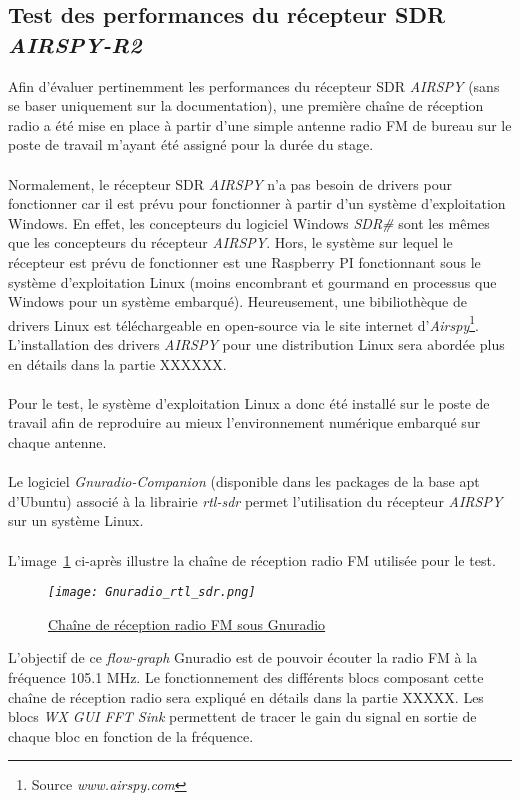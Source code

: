 \documentclass[12pt,fleqn]{book} %
\begin{document}
\subsection{Test des performances du récepteur SDR \emph{AIRSPY-R2}}
Afin d'évaluer pertinemment les performances du récepteur SDR \emph{AIRSPY} (sans se baser uniquement sur la documentation), une première chaîne de réception radio a été mise en place à partir d'une simple antenne radio FM de bureau sur le poste de travail m'ayant été assigné pour la durée du stage.
~\\\\Normalement, le récepteur SDR \emph{AIRSPY} n'a pas besoin de drivers pour fonctionner car il est prévu pour fonctionner à partir d'un système d'exploitation Windows. En effet, les concepteurs du logiciel Windows \emph{SDR\#} sont les mêmes que les concepteurs du récepteur \emph{AIRSPY}. Hors, le système sur lequel le récepteur est prévu de fonctionner est une Raspberry PI fonctionnant sous le système d'exploitation Linux (moins encombrant et gourmand en processus que Windows pour un système embarqué). Heureusement, une bibiliothèque de drivers Linux est téléchargeable en open-source via le site internet d'\emph{Airspy}\footnote{Source \emph{www.airspy.com}}. L'installation des drivers \emph{AIRSPY} pour une distribution Linux sera abordée plus en détails dans la partie XXXXXX.
~\\\\Pour le test, le système d'exploitation Linux a donc été installé sur le poste de travail afin de reproduire au mieux l'environnement numérique embarqué sur chaque antenne.
~\\\\Le logiciel \emph{Gnuradio-Companion} (disponible dans les packages de la base apt d'Ubuntu) associé à la librairie \emph{rtl-sdr} permet l'utilisation du récepteur \emph{AIRSPY} sur un système Linux. 
~\\\\L'image~\underline{\color{blue}\ref{gnu_airspy}} ci-après illustre la chaîne de réception radio FM utilisée pour le test.
\begin{figure}[H]
	\centering
	\itshape
	\texttt{[image: Gnuradio\_rtl\_sdr.png]}
	\caption{\label{gnu_airspy} \underline{Chaîne de réception radio FM sous Gnuradio}}
\end{figure}
L'objectif de ce \emph{flow-graph} Gnuradio est de pouvoir écouter la radio FM à la fréquence 105.1 MHz. Le fonctionnement des différents blocs composant cette chaîne de réception radio sera expliqué en détails dans la partie XXXXX. Les blocs \emph{WX GUI FFT Sink} permettent de tracer le gain du signal en sortie de chaque bloc en fonction de la fréquence.
\end{document}
